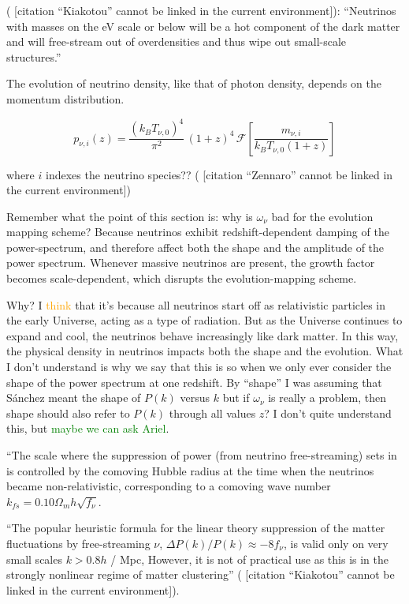 \documentclass[11pt]{article}
\newcommand{\cbib}[1]
{\IfFileExists{biblatex.sty}
{\cite{#1}}
{[citation ``#1'' cannot be linked in the current environment]}}
\begin{document}
(\cbib{Kiakotou}): ``Neutrinos with masses on the eV scale or below will be a
hot component of the dark matter and will free-stream out of overdensities and
thus wipe out small-scale structures.''

The evolution of neutrino density, like that of photon density, depends on the
momentum distribution.

\begin{equation}
    p_{\nu, i}(z)
    =
    \frac{(k_B T_{\nu, 0})^4}{\pi^2}
    \,
    (1 + z)^4
    \,
    \mathcal{F} \left[ \frac{m_{\nu, i}}{k_B T_{\nu, 0} (1 + z)} \right]
\end{equation}

where $i$ indexes the neutrino species?? (\cbib{Zennaro})

Remember what the point of this section is: why is $\omega_\nu$ bad for the
evolution mapping scheme? Because neutrinos exhibit redshift-dependent
damping of the power-spectrum, and therefore affect both the shape and the
amplitude of the power spectrum. Whenever massive neutrinos are present,
the growth factor becomes scale-dependent, which disrupts the
evolution-mapping scheme.

Why? I \textcolor{orange}{think} that it's because all neutrinos start off as
relativistic particles in the early Universe, acting as a type of radiation.
But as the Universe continues to expand and cool, the neutrinos behave
increasingly like dark matter.
In this way, the physical density in neutrinos impacts both the shape and the
evolution. What I don't understand is why we say that this is so when we
only ever consider the shape of the power spectrum at one redshift. By
``shape'' I was assuming that S\'{a}nchez meant the shape of $P(k)$ versus
$k$ but if $\omega_\nu$ is really a problem, then shape should also refer
to $P(k)$ through all values $z$? I don't quite understand this, but
\textcolor{green}{maybe we can ask Ariel}.

``The scale where the suppression of power (from neutrino free-streaming) sets
in is controlled by the comoving Hubble radius at the time when the neutrinos
became non-relativistic, corresponding to a comoving wave number
$k_{fs} = 0.10 \Omega_m h \sqrt{f_\nu}$.

``The popular heuristic formula for the linear theory suppression of the matter
fluctuations by free-streaming $\nu$, $\Delta P(k) / P(k) \approx -8 f_\nu$, is
valid only on very small scales $k > 0.8 h$ / Mpc, However, it is not of
practical use as this is in the strongly nonlinear regime of matter
clustering'' (\cbib{Kiakotou}).
\end{document}
